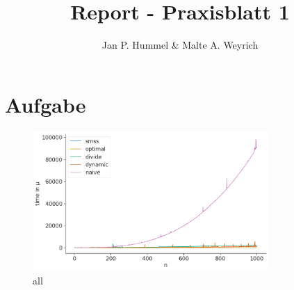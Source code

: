 \documentclass[10pt]{article}
\title{Report - Praxisblatt 1}
\author{Jan P. Hummel & Malte A. Weyrich}
\begin{document}
\maketitle

\section{Aufgabe}
\begin{figure}[h]
    \centering
    \includegraphics[width=0.8\textwidth]{../times_1000_all.png}
    \caption{all}
    \label{fig:Test}
\end{figure}
\end{document}
